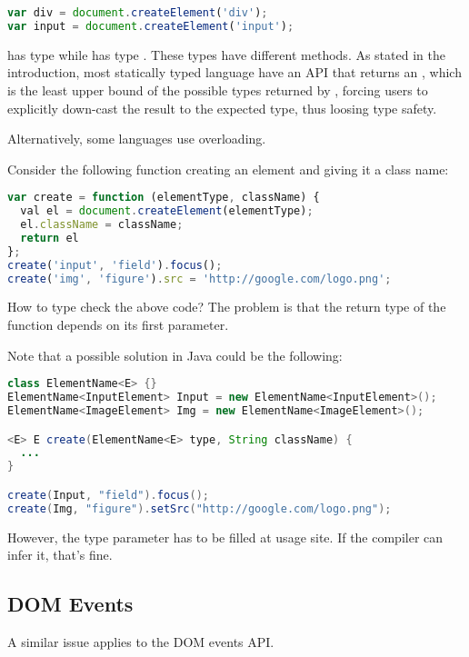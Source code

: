 \documentclass[runningheads,a4paper]{llncs}
\begin{document}
\begin{lstlisting}[language=JavaScript]
var div = document.createElement('div');
var input = document.createElement('input');
\end{lstlisting}

 has type  while  has type . These types have different
methods. As stated in the introduction, most statically typed language have an API that returns an ,
which is the least upper bound of the possible types returned by , forcing users to explicitly
down-cast the result to the expected type, thus loosing type safety.

Alternatively, some languages use overloading.

Consider the following function creating an element and giving it a class name:

\begin{lstlisting}[language=JavaScript]
var create = function (elementType, className) {
  val el = document.createElement(elementType);
  el.className = className;
  return el
};
create('input', 'field').focus();
create('img', 'figure').src = 'http://google.com/logo.png';
\end{lstlisting}

How to type check the above code? The problem is that the return type of the  function depends on its
first parameter.

Note that a possible solution in Java could be the following:

\begin{lstlisting}[language=Java]
class ElementName<E> {}
ElementName<InputElement> Input = new ElementName<InputElement>();
ElementName<ImageElement> Img = new ElementName<ImageElement>();

<E> E create(ElementName<E> type, String className) {
  ...
}

create(Input, "field").focus();
create(Img, "figure").setSrc("http://google.com/logo.png");
\end{lstlisting}

However, the type parameter  has to be filled at usage site. If the compiler can infer it, that’s fine.

\subsection{DOM Events}

A similar issue applies to the DOM events API.
\end{document}
